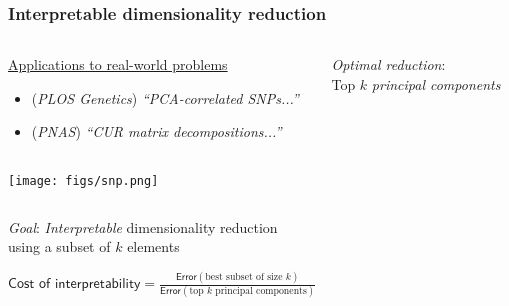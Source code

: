 \documentclass[10pt,handout]{beamer}
\begin{document}
\begin{frame}
  \frametitle{Interpretable dimensionality reduction}
  \begin{columns}
\begin{column}{.65\textwidth}
  \hspace{3mm}\underline{Applications to real-world problems}
  \begin{itemize}
  \item   \onslide<+->
    {\scriptsize\cite{paschou2007pca} (\textit{PLOS Genetics})
      \textit{``PCA-correlated SNPs...''}} %
\item   \onslide<+-> \cite{mahoney2009cur} (\textit{PNAS})
  {\scriptsize\textit{``CUR matrix decompositions...''}}
  \end{itemize}
\end{column}
\begin{column}{.4\textwidth}
  \vspace{-2mm}
  
  \emph{Optimal reduction}:\\[1mm]
  Top $k$ \textit{principal components}\\
  \\[5mm]
  \onslide<+->
\end{column}
\end{columns}
  \begin{center}
    \texttt{[image: figs/snp.png]}
  \end{center}
  \vspace{3mm}
  
  \begin{columns}
    \begin{column}{0.71\textwidth}
      \onslide<+->
      \emph{Goal}: \textit{Interpretable} dimensionality reduction\\
      using a subset of $k$ elements
\vspace{3mm}

\begin{block}{}
$\textsf{Cost of interpretability} =\frac{\mathsf{Error}(\text{best subset of size $k$})}{\mathsf{Error}(
        \text{top $k$ principal components})}$\hspace{-8mm}
\end{block}
      

\end{column}
\end{columns}
\end{frame}
\end{document}
